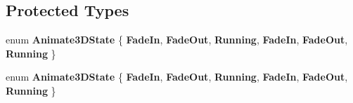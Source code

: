 \subsection*{Protected Types}
\begin{DoxyCompactItemize}
\item 
\mbox{\label{classAnimate3D_a0fec0940baac80382ddb04634468800e}} 
enum {\bfseries Animate3\+D\+State} \{ \newline
{\bfseries Fade\+In}, 
{\bfseries Fade\+Out}, 
{\bfseries Running}, 
{\bfseries Fade\+In}, 
\newline
{\bfseries Fade\+Out}, 
{\bfseries Running}
 \}
\item 
\mbox{\label{classAnimate3D_a0fec0940baac80382ddb04634468800e}} 
enum {\bfseries Animate3\+D\+State} \{ \newline
{\bfseries Fade\+In}, 
{\bfseries Fade\+Out}, 
{\bfseries Running}, 
{\bfseries Fade\+In}, 
\newline
{\bfseries Fade\+Out}, 
{\bfseries Running}
 \}
\end{DoxyCompactItemize}
